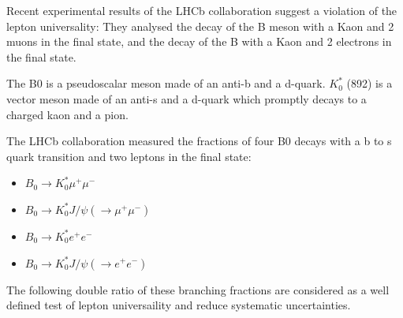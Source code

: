 \documentclass[english]{uzhpub}
\begin{document}
Recent experimental results of the LHCb collaboration \cite{bib:LU} suggest a violation of the lepton universality:
They analysed the decay of the B meson  with a Kaon and 2 muons in the final state, and the decay of the B with a Kaon and 2 electrons in the final state.

The B0 is a pseudoscalar meson made of an anti-b and a d-quark. $K^{*}_0$ (892)  is a vector meson made of an anti-s and a d-quark which promptly decays to a charged kaon and a pion.

The LHCb collaboration measured the fractions of four B0 decays with a b to s quark transition and two leptons in the final state:
\begin{itemize}
  \item $B_0 \rightarrow K^*_0 \mu^+ \mu^-$
  \item $B_0 \rightarrow K^*_0 J/\psi ( \rightarrow \mu^+ \mu^-)$
  \item $B_0 \rightarrow K^*_0 e^+ e^-$
  \item $B_0 \rightarrow K^*_0 J/\psi(\rightarrow e^+ e^-)$
\end{itemize}


The following double ratio of these branching fractions are considered as a well defined test of lepton universaility and reduce systematic uncertainties.
\end{document}
